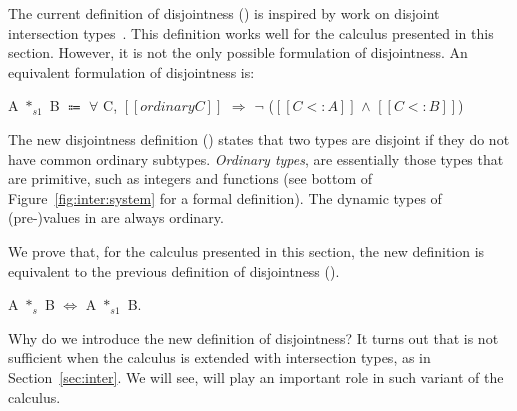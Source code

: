 The current definition of disjointness () is inspired
by work on disjoint intersection types~\cite{oliveira2016disjoint}. This definition works well
for the calculus presented in this section. However, it is not the only
possible formulation of disjointness.
An equivalent formulation of disjointness is:

\begin{definition}
    A $*_{s1}$ B $\Coloneqq$ $\forall$ C, $[[ordinary C]]$ $\Longrightarrow$ $\neg$ ($[[C <: A]]$ $\wedge$ $[[C <: B]]$)
    \label{def:union:disj1}
  \end{definition}

\noindent
The new disjointness definition () states that two
types are disjoint if they do not have common ordinary subtypes.
\emph{Ordinary types}, are essentially
those types that are primitive, such as integers and functions (see bottom
of Figure~\ref{fig:inter:system} for a formal definition).
The dynamic types of (pre-)values in \name are always ordinary.

We prove that, for the calculus presented in this section, the new definition is
equivalent to the previous definition of disjointness
().

\begin{lemma}
A $*_{s}$ B $\Longleftrightarrow$ A $*_{s1}$ B.
\end{lemma}

\noindent Why do we introduce the new definition of disjointness? It turns out that
 is not sufficient when the calculus is extended with
intersection types, as in Section~\ref{sec:inter}. We will see,
 will play an important role in such variant of the calculus.

